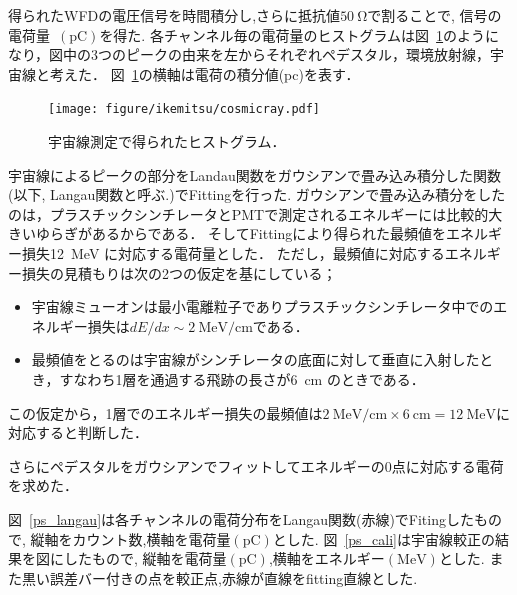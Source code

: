 得られたWFDの電圧信号を時間積分し,さらに抵抗値$50~\mathrm{\Omega}$で割ることで,
信号の電荷量~$(\mathrm{pC})$を得た.
各チャンネル毎の電荷量のヒストグラムは図~\ref{cosmicray}のようになり，図中の3つのピークの由来を左からそれぞれペデスタル，環境放射線，宇宙線と考えた．
図~\ref{cosmicray}の横軸は電荷の積分値(pc)を表す．
 \begin{figure}[H]
  \centering
  \texttt{[image: figure/ikemitsu/cosmicray.pdf]}
  \caption{宇宙線測定で得られたヒストグラム．}
  \label{cosmicray}
 \end{figure}%

宇宙線によるピークの部分をLandau関数をガウシアンで畳み込み積分した関数(以下, Langau関数と呼ぶ.)でFittingを行った.
ガウシアンで畳み込み積分をしたのは，プラスチックシンチレータとPMTで測定されるエネルギーには比較的大きいゆらぎがあるからである．
そしてFittingにより得られた最頻値をエネルギー損失12~MeV に対応する電荷量とした．
ただし，最頻値に対応するエネルギー損失の見積もりは次の2つの仮定を基にしている；
\begin{itemize}
 \item 宇宙線ミューオンは最小電離粒子でありプラスチックシンチレータ中でのエネルギー損失は$dE/dx\sim 2~\mathrm{MeV/cm }$である．
 \item 最頻値をとるのは宇宙線がシンチレータの底面に対して垂直に入射したとき，すなわち1層を通過する飛跡の長さが6~cm のときである．
\end{itemize}
この仮定から，1層でのエネルギー損失の最頻値は$2~\mathrm{MeV/cm}\times6~\mathrm{cm} = 12~\mathrm{MeV }$に対応すると判断した．\cite{leo}

さらにペデスタルをガウシアンでフィットしてエネルギーの0点に対応する電荷を求めた．

図~\ref{ps_langau}は各チャンネルの電荷分布をLangau関数(赤線)でFitingしたもので,
縦軸をカウント数,横軸を電荷量$(\mathrm{pC})$とした.
図~\ref{ps_cali}は宇宙線較正の結果を図にしたもので,
縦軸を電荷量$(\mathrm{pC})$,横軸をエネルギー$(\mathrm{MeV})$とした.
また黒い誤差バー付きの点を較正点,赤線が直線をfitting直線とした.

